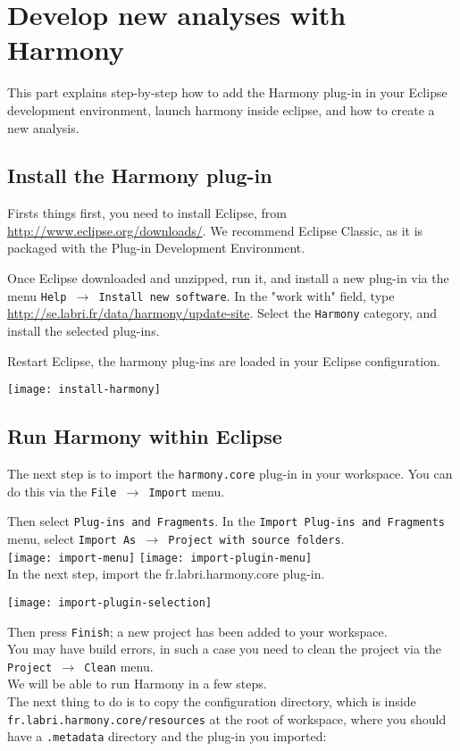 \chapter{Develop new analyses with Harmony}

This part explains step-by-step how to add the Harmony plug-in in your Eclipse development environment, launch harmony inside eclipse, and how to create a new analysis.


\section{Install the Harmony plug-in}
Firsts things first, you need to install Eclipse, from \url{http://www.eclipse.org/downloads/}. We recommend Eclipse Classic, as it is packaged with the Plug-in Development Environment.

Once Eclipse downloaded and unzipped, run it, and install a new plug-in via the menu \texttt{Help $\rightarrow$ Install new software}. In the "work with" field, type \url{http://se.labri.fr/data/harmony/update-site}. Select the \texttt{Harmony} category, and install the selected plug-ins.

Restart Eclipse, the harmony plug-ins are loaded in your Eclipse configuration.

\texttt{[image: install-harmony]}

\section{Run Harmony within Eclipse}

The next step is to import the \texttt{harmony.core} plug-in in your workspace.
You can do this via the \texttt{File $\rightarrow$ Import} menu.

Then select \texttt{Plug-ins and Fragments}. In the \texttt{Import Plug-ins and Fragments} menu, select \texttt{Import As $\rightarrow$ Project with source folders}.\\

\noindent
\texttt{[image: import-menu]}
\texttt{[image: import-plugin-menu]}\\

In the next step, import the fr.labri.harmony.core plug-in.

\texttt{[image: import-plugin-selection]}

Then press \texttt{Finish}; a new project has been added to your workspace.\\
You may have build errors, in such a case you need to clean the project via the \texttt{Project $\rightarrow$ Clean} menu.\\
We will be able to run Harmony in a few steps.\\
The next thing to do is to copy the configuration directory, which is inside \texttt{fr.labri.harmony.core/resources} at the root of workspace, where you should have a \texttt{.metadata} directory and the plug-in you imported:\\


